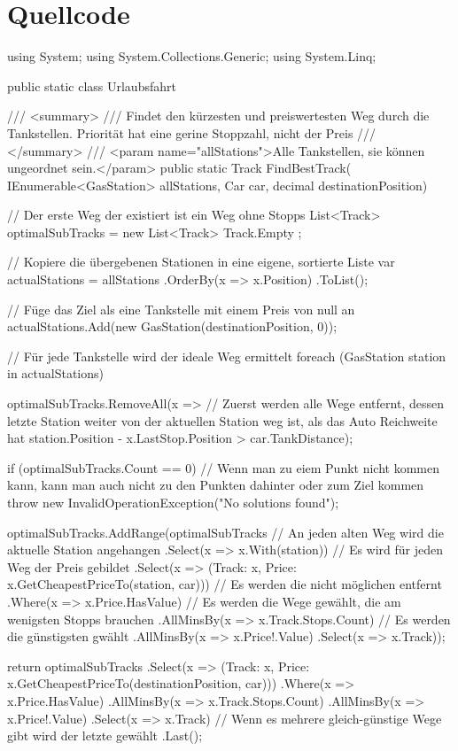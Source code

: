 \documentclass[a4paper,10pt,ngerman]{scrartcl}
\begin{document}
\section{Quellcode}
\begin{lstcs}
using System;
using System.Collections.Generic;
using System.Linq;

public static class Urlaubsfahrt
{
    /// <summary>
    /// Findet den kürzesten und preiswertesten Weg durch die Tankstellen. Priorität hat eine gerine Stoppzahl, nicht der Preis
    /// </summary>
    /// <param name="allStations">Alle Tankstellen, sie können ungeordnet sein.</param>
    public static Track FindBestTrack(
        IEnumerable<GasStation> allStations,
        Car car,
        decimal destinationPosition)
    {
        // Der erste Weg der existiert ist ein Weg ohne Stopps
        List<Track> optimalSubTracks = new List<Track> { Track.Empty };

        // Kopiere die übergebenen Stationen in eine eigene, sortierte Liste
        var actualStations = allStations
                .OrderBy(x => x.Position)
                .ToList();

        // Füge das Ziel als eine Tankstelle mit einem Preis von null an
        actualStations.Add(new GasStation(destinationPosition, 0));

        // Für jede Tankstelle wird der ideale Weg ermittelt
        foreach (GasStation station in actualStations)
        {
            optimalSubTracks.RemoveAll(x =>
                // Zuerst werden alle Wege entfernt, dessen letzte Station weiter von der aktuellen Station weg ist, als das Auto Reichweite hat
                station.Position - x.LastStop.Position > car.TankDistance);

            if (optimalSubTracks.Count == 0)
            {
                // Wenn man zu eiem Punkt nicht kommen kann, kann man auch nicht zu den Punkten dahinter oder zum Ziel kommen
                throw new InvalidOperationException("No solutions found");
            }

            optimalSubTracks.AddRange(optimalSubTracks
                // An jeden alten Weg wird die aktuelle Station angehangen
                .Select(x => x.With(station))
                // Es wird für jeden Weg der Preis gebildet
                .Select(x => (Track: x, Price: x.GetCheapestPriceTo(station, car)))
                // Es werden die nicht möglichen entfernt
                .Where(x => x.Price.HasValue)
                // Es werden die Wege gewählt, die am wenigsten Stopps brauchen
                .AllMinsBy(x => x.Track.Stops.Count)
                // Es werden die günstigsten gwählt
                .AllMinsBy(x => x.Price!.Value)
                .Select(x => x.Track));
        }

        return optimalSubTracks
            .Select(x => (Track: x, Price: x.GetCheapestPriceTo(destinationPosition, car)))
            .Where(x => x.Price.HasValue)
            .AllMinsBy(x => x.Track.Stops.Count)
            .AllMinsBy(x => x.Price!.Value)
            .Select(x => x.Track)
            // Wenn es mehrere gleich-günstige Wege gibt wird der letzte gewählt
            .Last();
    }
}
\end{lstcs}
\end{document}
